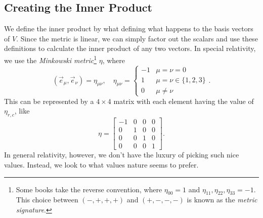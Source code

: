 \subsection{Creating the Inner Product}
We define the inner product by what defining what happens to the basis vectors of $V$.
Since the metric is linear, we can simply factor out the scalars and use these definitions to calculate the inner product of any two vectors.
In special relativity, we use the \emph{Minkowski metric}\footnote{Some books take the reverse convention, where $\eta_{00} = 1$ and $\eta_{11}, \eta_{22}, \eta_{33} = -1$. This choice between $(-,+,+,+)$ and $(+,-,-,-)$ is known as the \emph{metric signature}.} $\eta$, where 
\[ (\vec{e}_\mu,\vec{e}_\nu) = \eta_{\mu\nu},\quad \eta_{\mu\nu} = 
    \begin{cases}
        -1 & \mu = \nu = 0 \\
        1 & \mu = \nu \in \{1,2,3\} \\
        0 & \mu \not= \nu
    \end{cases}.
\]
This can be represented by a $4\times4$ matrix with each element having the value of $\eta_{r,c}$, like
\[
	\eta = 
    \begin{bmatrix}
        -1 & 0 & 0 & 0 \\
         0 & 1 & 0 & 0 \\
         0 & 0 & 1 & 0 \\
         0 & 0 & 0 & 1
    \end{bmatrix}.
\]
In general relativity, however, we don't have the luxury of picking such nice values.
Instead, we look to what values nature seems to prefer.
